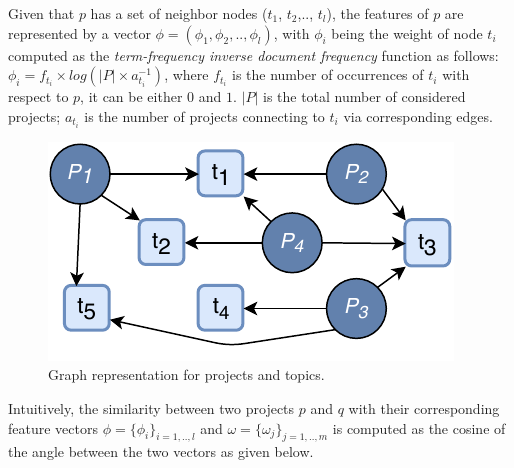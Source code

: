 Given that $p$ has a set of neighbor nodes ($t_{1}$, $t_{2}$,.., 
$t_{l}$), the features of $p$ are represented by a vector 
$\phi=(\phi_{1},\phi_{2},..,\phi_{l})$, with $\phi_{i}$ being the weight of 
node $t_{i}$ computed as the \emph{term-frequency inverse document 
frequency} function as follows: $\phi_{i} = f_{t_{i}} \times log( \left | P 
\right | \times a_{t_{i}}^{-1} )$, where $f_{t_{i}}$ is the number of 
occurrences of $t_{i}$ with respect to $p$, it can be either $0$ and $1$. 
$\left | P \right |$ is the total number of 
considered 
projects; $a_{t_{i}}$ is the number of projects connecting to $t_{i}$ 
via corresponding edges.
\begin{figure}[t!]
\centering
\includegraphics[width=0.8\columnwidth]{figs/graphCFtop.pdf}
\caption{Graph representation for projects and topics.}
\label{fig:Graph}
\end{figure}
Intuitively, the similarity between two projects $p$ and $q$ with their corresponding feature vectors $\phi=\{\phi_{i}\}_{i=1,..,l}$ and $\omega=\{\omega_{j}\}_{j=1,..,m}$ is computed as the cosine of the angle between the two vectors as given below. %

